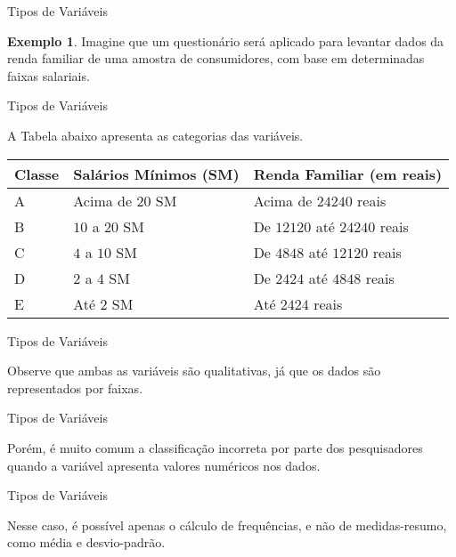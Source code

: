 \documentclass[10pt]{beamer}
\renewcommand{\indent}{\hspace*{2em}}
\theoremstyle{definition}
\newtheorem{ex}[defn]{\textcolor{strpink}{Exemplo}}
\begin{document}
\begin{frame}{Tipos de Variáveis}
\begin{ex}
\vfill\indent Imagine que um questionário será aplicado para levantar dados da renda familiar de uma amostra de consumidores, com base em determinadas faixas salariais. 
\end{ex}
\end{frame}

\begin{frame}{Tipos de Variáveis}
\begin{block}{}
\vfill A Tabela abaixo apresenta as categorias das variáveis.
\begin{table}[]
\begin{tabular}{|l|l|l|}
\hline
 Classe & Salários Mínimos (SM) & Renda Familiar (em reais) \\ \hline
 A & Acima de $20$ SM & Acima de $24240$ reais \\ \hline
 B & $10$ a $20$ SM & De $12120$ até $24240$ reais \\ \hline
 C & $4$ a $10$ SM & De $4848$ até $12120$ reais \\ \hline
 D & $2$ a $4$ SM &  De $2424$ até $4848$ reais \\ \hline
 E & Até $2$ SM &  Até $2424$ reais\\ \hline
\end{tabular}
\end{table}
\end{block}
\end{frame}

\begin{frame}{Tipos de Variáveis}
\begin{block}{}
\vfill\indent Observe que ambas as variáveis são qualitativas, já que os dados são representados por faixas.
\end{block}
\end{frame}

\begin{frame}{Tipos de Variáveis}
\begin{block}{}
\vfill Porém, é muito comum a classificação incorreta por parte dos pesquisadores quando a variável apresenta valores numéricos nos dados.
\end{block}
\end{frame}

\begin{frame}{Tipos de Variáveis}
\begin{block}{}
\vfill Nesse caso, é possível apenas o cálculo de frequências, e não de medidas-resumo, como média e desvio-padrão. 
\end{block}
\end{frame}
\end{document}

